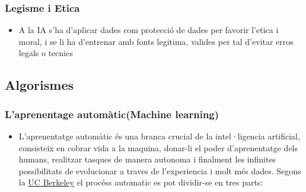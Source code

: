 \subsubsection{Legisme i Etica}
\begin{itemize}
 \item A la IA s'ha d'aplicar dades com protecció de dades per favorir l'etica i moral, i se li ha d'entrenar amb fonts legitima, valides per tal d'evitar erros legals o tecnics
\end{itemize}


\subsection{Algorismes}\label{subsec:Algorismes}

\subsubsection{L'aprenentage automàtic(Machine learning)}
\begin{itemize}
 \item L'aprenentatge automàtic és una branca crucial de la intel·ligencia artificial, consisteix en cobrar vida a la maquina, donar-li el poder d'aprenentatge dels humans, realitzar tasques de manera autonoma i finalment les infinites possibilitats de evolucionar a traves de l'experiencia i molt més dades. Segons la \href{https://ischoolonline.berkeley.edu/blog/what-is-machine-learning/}{UC Berkeley} el procéss automatic es pot dividir-se en tres parts:

   \end{itemize}
